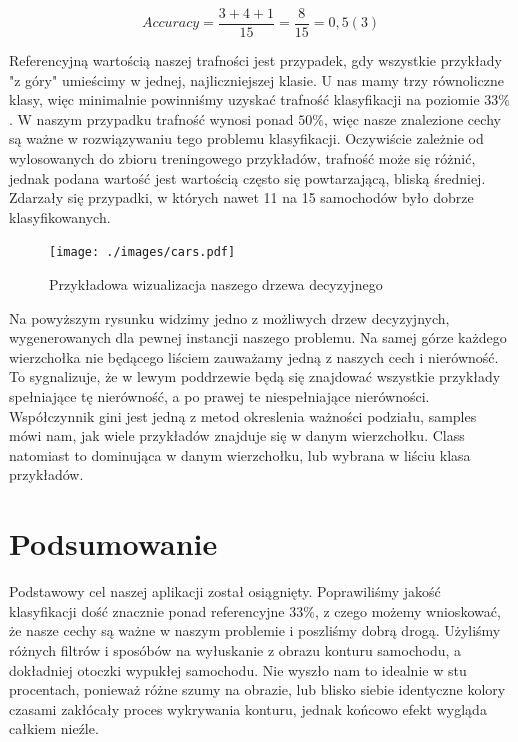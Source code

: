 \documentclass{article}
\begin{document}
\begin{equation}
Accuracy = \frac{3 + 4 + 1}{15} = \frac{8}{15} = 0,5(3)
\end{equation}

Referencyjną wartością naszej trafności jest przypadek, gdy wszystkie przykłady "z góry" umieścimy w jednej, najliczniejszej klasie. U nas mamy trzy równoliczne klasy, więc minimalnie powinniśmy uzyskać trafność klasyfikacji na poziomie $33\%$. W naszym przypadku trafność wynosi ponad $50\%$, więc nasze znalezione cechy są ważne w rozwiązywaniu tego problemu klasyfikacji. Oczywiście zależnie od wylosowanych do zbioru treningowego przykładów, trafność może się różnić, jednak podana wartość jest wartością często się powtarzającą, bliską średniej. Zdarzały się przypadki, w których nawet 11 na 15 samochodów było dobrze klasyfikowanych. 

\begin{figure}[H]
\begin{center}
\texttt{[image: ./images/cars.pdf]}
\end{center}
\caption{Przykładowa wizualizacja naszego drzewa decyzyjnego}
\label{fig: wykres3}
\end{figure}

Na powyższym rysunku widzimy jedno z możliwych drzew decyzyjnych, wygenerowanych dla pewnej instancji naszego problemu. Na samej górze każdego wierzchołka nie będącego liściem zauważamy jedną z naszych cech i nierówność. To sygnalizuje, że w lewym poddrzewie będą się znajdować wszystkie przykłady spełniające tę nierówność, a po prawej te niespełniające nierówności. Współczynnik gini jest jedną z metod okreslenia ważności podziału, samples mówi nam, jak wiele przykładów znajduje się w danym wierzchołku. Class natomiast to dominująca w danym wierzchołku, lub wybrana w liściu klasa przykładów.

\section{Podsumowanie}
Podstawowy cel naszej aplikacji został osiągnięty. Poprawiliśmy jakość klasyfikacji dość znacznie ponad referencyjne $33\%$, z czego możemy wnioskować, że nasze cechy są ważne w naszym problemie i poszliśmy dobrą drogą. Użyliśmy różnych filtrów i sposóbów na wyłuskanie z obrazu konturu samochodu, a dokładniej otoczki wypukłej samochodu. Nie wyszło nam to idealnie w stu procentach, ponieważ różne szumy na obrazie, lub blisko siebie identyczne kolory czasami zakłócały proces wykrywania konturu, jednak końcowo efekt wygląda całkiem nieźle. 
\end{document}
